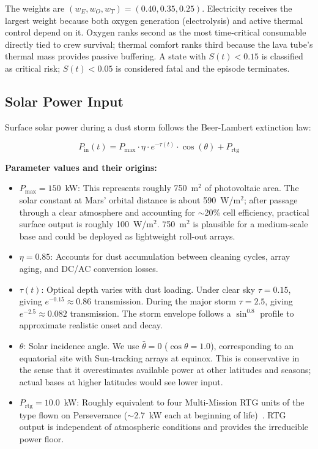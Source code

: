 \documentclass[11pt,a4paper]{article}
\begin{document}
The weights are $(w_E, w_O, w_T) = (0.40, 0.35, 0.25)$. Electricity receives the largest weight because both oxygen generation (electrolysis) and active thermal control depend on it. Oxygen ranks second as the most time-critical consumable directly tied to crew survival; thermal comfort ranks third because the lava tube's thermal mass provides passive buffering. A state with $S(t) < 0.15$ is classified as critical risk; $S(t) < 0.05$ is considered fatal and the episode terminates.

\subsection{Solar Power Input}

Surface solar power during a dust storm follows the Beer-Lambert extinction law:

\begin{equation}\label{eq:solar}
  P_{\text{in}}(t) = P_{\text{max}} \cdot \eta \cdot e^{-\tau(t)} \cdot \cos(\theta) + P_{\text{rtg}}
\end{equation}

\textbf{Parameter values and their origins:}
\begin{itemize}
  \item $P_{\text{max}} = 150$~kW: This represents roughly 750~m$^2$ of photovoltaic area. The solar constant at Mars' orbital distance is about 590~W/m$^2$; after passage through a clear atmosphere and accounting for $\sim$20\% cell efficiency, practical surface output is roughly 100~W/m$^2$. 750~m$^2$ is plausible for a medium-scale base and could be deployed as lightweight roll-out arrays.
  \item $\eta = 0.85$: Accounts for dust accumulation between cleaning cycles, array aging, and DC/AC conversion losses.
  \item $\tau(t)$: Optical depth varies with dust loading. Under clear sky $\tau = 0.15$, giving $e^{-0.15} \approx 0.86$ transmission. During the major storm $\tau = 2.5$, giving $e^{-2.5} \approx 0.082$ transmission. The storm envelope follows a $\sin^{0.8}$ profile to approximate realistic onset and decay.
  \item $\theta$: Solar incidence angle. We use $\bar{\theta} = 0$ ($\cos\theta = 1.0$), corresponding to an equatorial site with Sun-tracking arrays at equinox. This is conservative in the sense that it overestimates available power at other latitudes and seasons; actual bases at higher latitudes would see lower input.
  \item $P_{\text{rtg}} = 10.0$~kW: Roughly equivalent to four Multi-Mission RTG units of the type flown on Perseverance ($\sim$2.7~kW each at beginning of life)~\cite{kilopower}. RTG output is independent of atmospheric conditions and provides the irreducible power floor.
\end{itemize}
\end{document}
